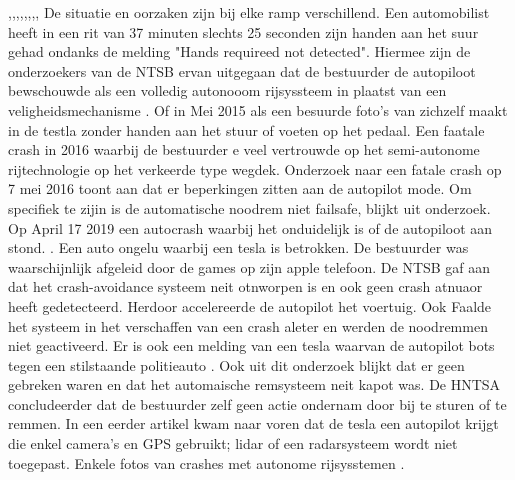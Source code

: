 \cite{anderson30042021secondteslacrash},\cite{raynal20042021probeTeslaCrash},\cite{firstpress11052021fatalnonautopilot},\cite{cochran18042021nodriverTeslaCrash},\cite{gitlin11052021autopilot},\cite{sommerfield12072021NHTSAmandateresult},\cite{hawkins30062021nhtsarequiresreporting},\cite{wilson19042021teslacrashregulators},\cite{mcfarland22042021selfdrivingrisks}
De situatie en oorzaken zijn bij elke ramp verschillend. 
Een automobilist heeft in een rit van 37 minuten slechts 25 seconden zijn handen aan het suur gehad ondanks de melding "Hands requireed not detected". Hiermee zijn de onderzoekers van de NTSB ervan uitgegaan dat de bestuurder de autopiloot bewschouwde als een volledig autonooom rijsyssteem in plaatst van een veligheidsmechanisme
\cite{oremus21062017fatalTeslaCrash}. Of in 
Mei 2015 als een besuurde foto's van zichzelf maakt in de testla zonder handen aan het stuur of voeten op het pedaal.
\cite{guardian15052021teslacrashHandsOnWheel}
Een faatale crash in 2016 waarbij de bestuurder  e veel vertrouwde op het semi-autonome rijtechnologie op het verkeerde type wegdek.
\cite{Puzzanghera13092017TeslaSharesBlame}
Onderzoek naar een fatale crash op 7 mei 2016 toont aan dat er beperkingen zitten aan de autopilot mode. Om specifiek te zijin is de automatische noodrem niet failsafe, blijkt uit onderzoek.
\cite{jaillet02022017teslaAutopilotLimitations}
\cite{reuters03102019teslaAutoParkingFail}
\cite{dowling23042021}
Op  April 17 2019 een autocrash waarbij het onduidelijk is of de autopiloot aan stond.
\cite{young05112021fatalTeslaReport}. Een auto ongelu waarbij een tesla is betrokken. De bestuurder was waarschijnlijk afgeleid door de games op zijn apple telefoon. De NTSB gaf aan dat het crash-avoidance systeem neit otnworpen is en ook geen crash atnuaor heeft gedetecteerd. Herdoor accelereerde de autopilot  het voertuig. Ook Faalde het systeem in het verschaffen van een crash aleter en werden de noodremmen niet geactiveerd.
\cite{tiungteslasoftwarecrash}
Er is ook een melding van een tesla waarvan de autopilot bots tegen een stilstaande politieauto
\cite{kierstein18032021teslaAutopilotCrashStationary}. Ook uit dit onderzoek blijkt dat er geen gebreken waren en dat het automaische remsysteem neit kapot was. De HNTSA concludeerder dat de bestuurder zelf geen actie ondernam door  bij te sturen of te remmen. In een eerder artikel kwam naar voren dat de tesla een autopilot krijgt die enkel camera's en GPS gebruikt; lidar of een radarsysteem wordt niet toegepast.
\cite{janssen20062017teslacrashdetailflorida}
Enkele fotos van crashes met autonome rijsysstemen \cite{saferoardsCrashesAutonomousvehicles}.
